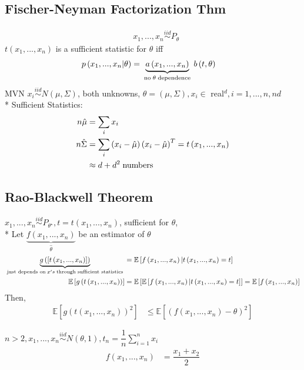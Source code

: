 \documentclass{article}
\begin{document}
\subsection{Fischer-Neyman Factorization Thm}
\begin{align*}
&x_{1}, ..., x_{n} \stackrel{iid}{\sim} P_{\theta}
\end{align*}
$t\left(x_{1}, ..., x_{n}\right) $ is a sufficient statistic for $\theta$ iff
\begin{align*}
p\left(x_{1}, ..., x_{n} | \theta\right)  &= \underbrace{a\left(x_{1}, ..., x_{n}\right)}_{\text{\;no\;} \theta \text{\;dependence\;}} b\left(t, \theta\right)
\end{align*}
MVN $x_{i} \stackrel{iid}{\sim} N\left(\mu, \Sigma\right)$, both unknowns, $\theta = \left(\mu, \Sigma\right), x_{i} \in$ real$^{d}, i  = 1, ..., n , n  d $
\\* Sufficient Statistics:
\begin{align*}
n  \hat{\mu} &= \displaystyle\sum_{i} x_{i}
\\ n  \hat{\Sigma} &= \displaystyle\sum_{i} \left(x_{i} - \hat{\mu}\right)\left(x_{i} - \hat{\mu}\right)^{T} = t\left(x_{1}, ..., x_{n}\right)
\\ &\approx d + d^{2} \text{\;numbers\;}
\end{align*}


\subsection{Rao-Blackwell Theorem}
$x_{1}, ..., x_{n} \stackrel{iid}{\sim} P_{\theta^\star }, t = t\left(x_{1}, ..., x_{n}\right)$, sufficient for $\theta$,
\\* Let $\underbrace{f\left(x_{1}, ..., x_{n}\right) }_{\hat{\theta}}$ be an estimator of $\theta$
\begin{align*}
\underbrace{g\left( \left[t\left(x_{1}, ..., x_{n}\right)\right] \right) }_{\text{\;just depends on\;} x's \text{\;through sufficient statistics\;}} &= \mathbb{E}\left[f\left(x_{1}, ..., x_{n}\right) | t\left(x_{1}, ..., x_{n}\right) = t\right]
\\ \mathbb{E}\left[g\left( t\left(x_{1}, ..., x_{n}\right) \right)\right] &= \mathbb{E}\left[\mathbb{E}\left[f\left(x_{1}, ..., x_{n}\right) | t\left(x_{1}, ..., x_{n}\right) = t\right]\right] = \mathbb{E}\left[f\left(x_{1}, ..., x_{n}\right)\right]
\end{align*}
Then,
\begin{align*}
\mathbb{E}\left[g\left(t\left(x_{1}, ..., x_{n}\right)\right)^{2}\right] &\leq  \mathbb{E}\left[\left(f\left(x_{1}, ..., x_{n}\right) - \theta\right)^{2}\right]
\end{align*}
\begin{eg} \label{eg:raoblack} 
$n  > 2, x_{1}, ..., x_{n} \stackrel{iid}{\sim} N\left(\theta, 1\right), t_{n} = \dfrac{1}{n} \displaystyle\sum_{i=1}^{n} x_{i}$
\begin{align*}
f\left(x_{1}, ..., x_{n}\right)  &= \dfrac{x_{1} + x_{2}}{2}
\end{align*}\end{eg}
\end{document}

